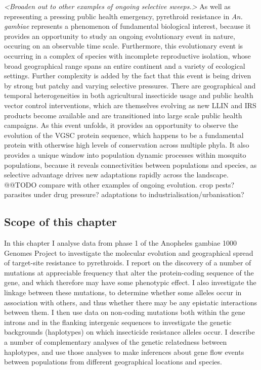 \documentclass[a4paper,11pt,abstracton,hidelinks]{scrartcl}
\begin{document}
\textit{<Broaden out to other examples of ongoing selective sweeps.>}
%
As well as representing a pressing public health emergency, pyrethroid resistance in \textit{An. gambiae} represents a phenomenon of fundamental biological interest, because it provides an opportunity to study an ongoing evolutionary event in nature, occuring on an observable time scale.
%
Furthermore, this evolutionary event is occurring in a complex of species with incomplete reproductive isolation, whose broad geographical range spans an entire continent and a variety of ecological settings.
%
Further complexity is added by the fact that this event is being driven by strong but patchy and varying selective pressures.
%
There are geographical and temporal heterogeneities in both agricultural insecticide usage and public health vector control interventions, which are themselves evolving as new LLIN and IRS products become available and are transitioned into large scale public health campaigns.
%
As this event unfolds, it provides an opportunity to observe the evolution of the VGSC protein sequence, which happens to be a fundamental protein with otherwise high levels of conservation across multiple phyla.
%
It also provides a unique window into population dynamic processes within mosquito populations, because it reveals connectivities between populations and species, as selective advantage drives new adaptations rapidly across the landscape.
%
@@TODO compare with other examples of ongoing evolution. crop pests? parasites under drug pressure? adaptations to industrialisation/urbanisation?


\subsection*{Scope of this chapter}


In this chapter I analyse data from phase 1 of the Anopheles gambiae 1000 Genomes Project to investigate the molecular evolution and geographical spread of target-site resistance to pyrethroids.
%
I report on the discovery of a number of mutations at appreciable frequency that alter the protein-coding sequence of the gene, and which therefore may have some phenotypic effect.
%
I also investigate the linkage between these mutations, to determine whether some alleles occur in association with others, and thus whether there may be any epistatic interactions between them.
%
I then use data on non-coding mutations both within the gene introns and in the flanking intergenic sequences to investigate the genetic backgrounds (haplotypes) on which insecticide resistance alleles occur.
%
I describe a number of complementary analyses of the genetic relatedness between haplotypes, and use those analyses to make inferences about gene flow events between populations from different geographical locations and species.
\end{document}
